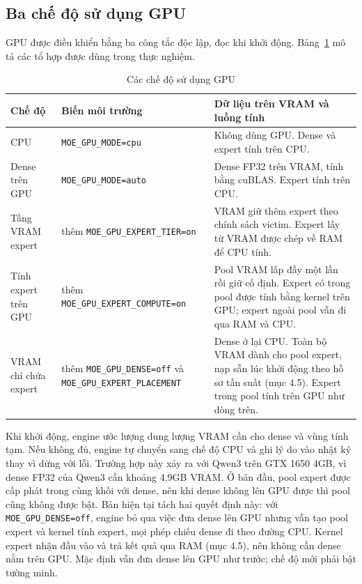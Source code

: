 \subsection{Ba chế độ sử dụng GPU}

GPU được điều khiển bằng ba công tắc độc lập, đọc khi khởi động. Bảng~\ref{tab:gpu_modes} mô tả các tổ hợp được dùng trong thực nghiệm.

\begin{table}[htbp]
\centering
\caption{Các chế độ sử dụng GPU}
\label{tab:gpu_modes}
\small
\setlength{\tabcolsep}{3pt}
\begin{tabularx}{\textwidth}{>{\RaggedRight\arraybackslash}p{2.6cm} >{\RaggedRight\arraybackslash\footnotesize}p{5.0cm} >{\RaggedRight\arraybackslash}X}
\toprule
\textbf{Chế độ} & \textbf{Biến môi trường} & \textbf{Dữ liệu trên VRAM và luồng tính} \\
\midrule
CPU & \texttt{MOE\_GPU\_MODE=cpu} & Không dùng GPU. Dense và expert tính trên CPU. \\
Dense trên GPU & \texttt{MOE\_GPU\_MODE=auto} & Dense FP32 trên VRAM, tính bằng cuBLAS. Expert tính trên CPU. \\
Tầng VRAM expert & thêm \texttt{MOE\_GPU\_EXPERT\_TIER=on} & VRAM giữ thêm expert theo chính sách victim. Expert lấy từ VRAM được chép về RAM để CPU tính. \\
Tính expert trên GPU & thêm \texttt{MOE\_GPU\_EXPERT\_COMPUTE=on} & Pool VRAM lấp đầy một lần rồi giữ cố định. Expert có trong pool được tính bằng kernel trên GPU; expert ngoài pool vẫn đi qua RAM và CPU. \\
VRAM chỉ chứa expert & thêm \texttt{MOE\_GPU\_DENSE=off} và \texttt{MOE\_GPU\_EXPERT\_PLACEMENT} & Dense ở lại CPU. Toàn bộ VRAM dành cho pool expert, nạp sẵn lúc khởi động theo hồ sơ tần suất (mục 4.5). Expert trong pool tính trên GPU như dòng trên. \\
\bottomrule
\end{tabularx}
\par{}
\end{table}

Khi khởi động, engine ước lượng dung lượng VRAM cần cho dense và vùng tính tạm. Nếu không đủ, engine tự chuyển sang chế độ CPU và ghi lý do vào nhật ký thay vì dừng với lỗi. Trường hợp này xảy ra với Qwen3 trên GTX 1650 4GB, vì dense FP32 của Qwen3 cần khoảng 4,9GB VRAM. Ở bản đầu, pool expert được cấp phát trong cùng khối với dense, nên khi dense không lên GPU được thì pool cũng không được bật. Bản hiện tại tách hai quyết định này: với \texttt{MOE\_GPU\_DENSE=off}, engine bỏ qua việc đưa dense lên GPU nhưng vẫn tạo pool expert và kernel tính expert, mọi phép chiếu dense đi theo đường CPU. Kernel expert nhận đầu vào và trả kết quả qua RAM (mục 4.5), nên không cần dense nằm trên GPU. Mặc định vẫn đưa dense lên GPU như trước; chế độ mới phải bật tường minh.

